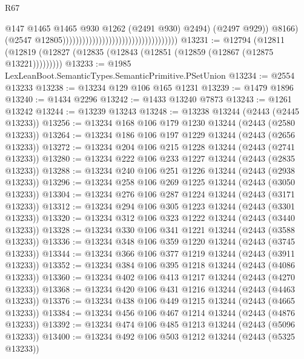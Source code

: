 \begin{lexlean}{R67}
\begin{coremodule}
                                                                              @147
                                                                              @1465
                                                                              @1465
                                                                              @930
                                                                              @1262
                                                                              (@2491 @930)
                                                                              @2494)
                                                                            (@2497 @929))
                                                                          @8166)
                                                                        (@2547
                                                                          @12805)))))))))))))))))))))))))))))))))))
@13231 := @12794
    (@12811 (@12819 (@12827 (@12835 (@12843 (@12851 (@12859 (@12867 (@12875 @13221)))))))))
@13233 := @1985 LexLeanBoot.SemanticTypes.SemanticPrimitive.PSetUnion
@13234 := @2554 @13233
@13238 := @13234 @129 @106 @165 @1231
@13239 := @1479 @1896
@13240 := @1434 @2296
@13242 := @1433 @13240 @7873
@13243 := @1261 @13242
@13244 := @13239 @13243
@13248 := @13238 @13244 (@2443 (@2445 @13233))
@13256 := @13234 @168 @106 @179 @1230 @13244 (@2443 (@2580 @13233))
@13264 := @13234 @186 @106 @197 @1229 @13244 (@2443 (@2656 @13233))
@13272 := @13234 @204 @106 @215 @1228 @13244 (@2443 (@2741 @13233))
@13280 := @13234 @222 @106 @233 @1227 @13244 (@2443 (@2835 @13233))
@13288 := @13234 @240 @106 @251 @1226 @13244 (@2443 (@2938 @13233))
@13296 := @13234 @258 @106 @269 @1225 @13244 (@2443 (@3050 @13233))
@13304 := @13234 @276 @106 @287 @1224 @13244 (@2443 (@3171 @13233))
@13312 := @13234 @294 @106 @305 @1223 @13244 (@2443 (@3301 @13233))
@13320 := @13234 @312 @106 @323 @1222 @13244 (@2443 (@3440 @13233))
@13328 := @13234 @330 @106 @341 @1221 @13244 (@2443 (@3588 @13233))
@13336 := @13234 @348 @106 @359 @1220 @13244 (@2443 (@3745 @13233))
@13344 := @13234 @366 @106 @377 @1219 @13244 (@2443 (@3911 @13233))
@13352 := @13234 @384 @106 @395 @1218 @13244 (@2443 (@4086 @13233))
@13360 := @13234 @402 @106 @413 @1217 @13244 (@2443 (@4270 @13233))
@13368 := @13234 @420 @106 @431 @1216 @13244 (@2443 (@4463 @13233))
@13376 := @13234 @438 @106 @449 @1215 @13244 (@2443 (@4665 @13233))
@13384 := @13234 @456 @106 @467 @1214 @13244 (@2443 (@4876 @13233))
@13392 := @13234 @474 @106 @485 @1213 @13244 (@2443 (@5096 @13233))
@13400 := @13234 @492 @106 @503 @1212 @13244 (@2443 (@5325 @13233))

\end{coremodule}
\end{lexlean}
